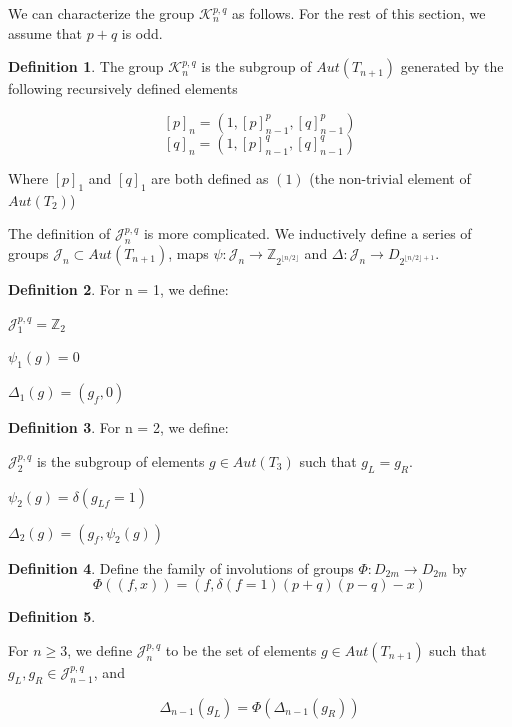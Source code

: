 \documentclass[11pt]{article}
\theoremstyle{plain}
\theoremstyle{definition}
\newtheorem{definition}{Definition}
\begin{document}
We can characterize the group $\mathcal{K}_n^{p, q}$ as follows. For the rest of this section, we assume that $p+q$ is odd.

\begin{definition}
The group $\mathcal{K}_n^{p,q}$ is the subgroup of $Aut(T_{n+1})$ generated by the following recursively defined elements

$$[p]_n = (1, [p]_{n-1}^p, [q]_{n-1}^p)$$
$$[q]_n = (1, [p]_{n-1}^q, [q]_{n-1}^q)$$

Where $[p]_1$ and $[q]_1$ are both defined as $(1)$ (the non-trivial element of $Aut(T_2)$)


\end{definition}

The definition of $\mathcal{J}_n^{p,q}$ is more complicated. We inductively define a series of groups $\mathcal{J}_n \subset Aut(T_{n+1})$,  maps $\psi: \mathcal{J}_n \rightarrow \mathbb{Z}_{2^{\lfloor n/2 \rfloor}}$ and $\Delta: \mathcal{J}_n \rightarrow D_{2^{\lfloor n/2 \rfloor+1}}$.

\begin{definition}
For n = 1, we define:


$\mathcal{J}_1^{p,q} = \mathbb{Z}_2$

$\psi_1(g) = 0$

$\Delta_1(g) = (g_f, 0)$

\end{definition}
\begin{definition}
    
For n = 2, we define:

$\mathcal{J}_2^{p,q}$ is the subgroup of elements $g \in Aut(T_3)$ such that $g_L = g_R$.

$\psi_2(g) = \delta(g_{Lf} = 1)$

$\Delta_2(g) = (g_f, \psi_2(g))$

\end{definition}

\begin{definition}
    Define the family of involutions of groups 
    $\Phi:D_{2m} \rightarrow D_{2m}$
    by 
    $$\Phi((f, x)) = (f, \delta(f=1) (p+q)(p-q) - x)$$
\end{definition}


\begin{definition}\label{group}

    For $n \geq 3$, we define $\mathcal{J}_n^{p,q}$ to be the set of elements $g \in Aut(T_{n+1})$ such that $g_L, g_R \in \mathcal{J}_{n-1}^{p,q}$, and

    $$\Delta_{n-1}(g_L) = \Phi(\Delta_{n-1}(g_R) )$$

    
\end{definition}
\end{document}
